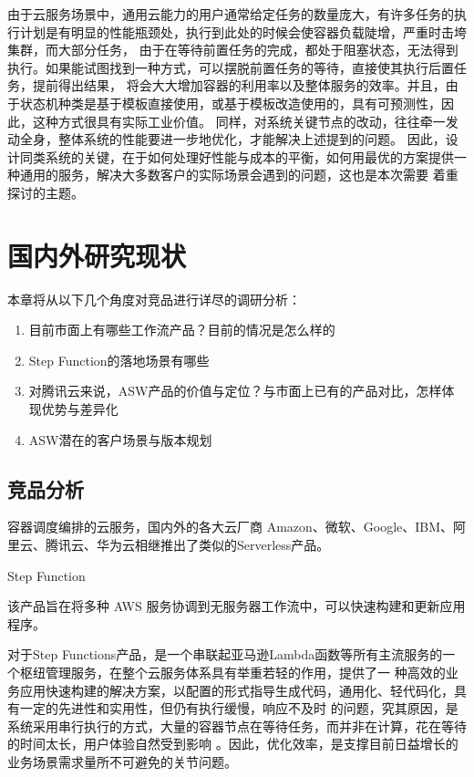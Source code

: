 \cite{wlfwyh}
由于云服务场景中，通用云能力的用户通常给定任务的数量庞大，有许多任务的执行计划是有明显的性能瓶颈处，执行到此处的时候会使容器负载陡增，严重时击垮集群，而大部分任务，
由于在等待前置任务的完成，都处于阻塞状态，无法得到执行。如果能试图找到一种方式，可以摆脱前置任务的等待，直接使其执行后置任务，提前得出结果，
将会大大增加容器的利用率以及整体服务的效率。并且，由于状态机种类是基于模板直接使用，或基于模板改造使用的，具有可预测性，因此，这种方式很具有实际工业价值。
同样，对系统关键节点的改动，往往牵一发动全身，整体系统的性能要进一步地优化，才能解决上述提到的问题。
\cite{jywfbpxt}
因此，设计同类系统的关键，在于如何处理好性能与成本的平衡，如何用最优的方案提供一种通用的服务，解决大多数客户的实际场景会遇到的问题，这也是本次需要
着重探讨的主题。


\section{国内外研究现状}

本章将从以下几个角度对竞品进行详尽的调研分析：
\begin{enumerate}
    \item 目前市面上有哪些工作流产品？目前的情况是怎么样的
    \item Step Function的落地场景有哪些
    \item 对腾讯云来说，ASW产品的价值与定位？与市面上已有的产品对比，怎样体现优势与差异化
    \item ASW潜在的客户场景与版本规划
\end{enumerate}

\subsection{竞品分析}

容器调度编排的云服务，国内外的各大云厂商 Amazon、微软、Google、IBM、阿里云、腾讯云、华为云相继推出了类似的Serverless产品。

Step Function

该产品旨在将多种 AWS 服务协调到无服务器工作流中，可以快速构建和更新应用程序\cite{jywfbpxt}。

对于Step Functions产品，是一个串联起亚马逊Lambda函数等所有主流服务的一个枢纽管理服务，在整个云服务体系具有举重若轻的作用，提供了一
种高效的业务应用快速构建的解决方案，以配置的形式指导生成代码，通用化、轻代码化，具有一定的先进性和实用性，但仍有执行缓慢，响应不及时
的问题，究其原因，是系统采用串行执行的方式，大量的容器节点在等待任务，而并非在计算，花在等待的时间太长，用户体验自然受到影响
\cite{jybpmsyc}。因此，优化效率，是支撑目前日益增长的业务场景需求量所不可避免的关节问题。

